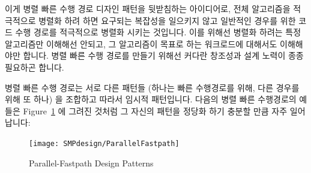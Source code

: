 이게 병렬 빠른 수행 경로 디자인 패턴을 뒷받침하는 아이디어로, 전체 알고리즘을
적극적으로 병렬화 하려 하면 요구되는 복잡성을 일으키지 않고 일반적인 경우를
위한 코드 수행 경로를 적극적으로 병렬화 시키는 것입니다.
이를 위해선 병렬화 하려는 특정 알고리즘만 이해해선 안되고, 그 알고리즘이 목표로
하는 워크로드에 대해서도 이해해야만 합니다.
병렬 빠른 수행 경로를 만들기 위해선 커다란 창조성과 설계 노력이 종종 필요하곤
합니다.

병렬 빠른 수행 경로는 서로 다른 패턴들 (하나는 빠른 수행경로를 위해, 다른
경우를 위해 또 하나) 을 조합하고 따라서 임시적 패턴입니다.
다음의 병렬 빠른 수행경로의 예들은
Figure~\ref{fig:SMPdesign:Parallel-Fastpath Design Patterns} 에 그려진 것처럼
그 자신의 패턴을 정당화 하기 충분할 만큼 자주 일어납니다:

\begin{figure}[htb]
\begin{center}
\texttt{[image: SMPdesign/ParallelFastpath]}
\end{center}
\caption{Parallel-Fastpath Design Patterns}
\label{fig:SMPdesign:Parallel-Fastpath Design Patterns}
\end{figure}

